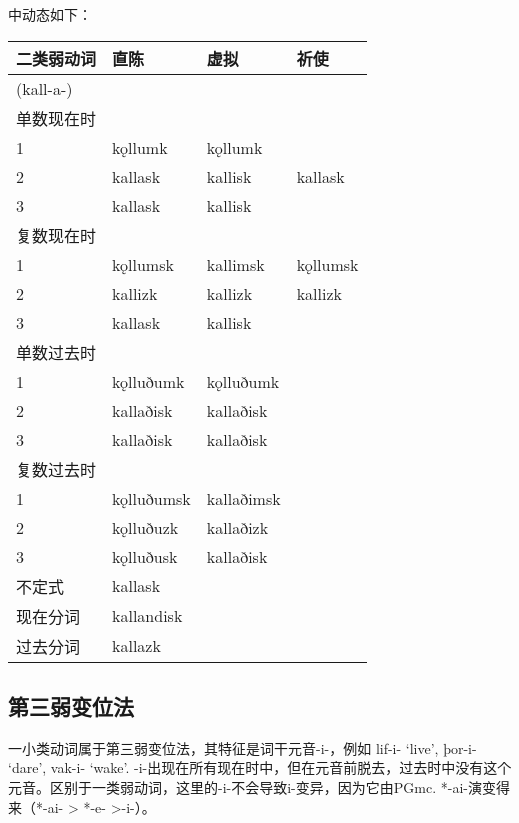 中动态如下：

\begin{longtable}{llll}
  \toprule
  二类弱动词     & 直陈         & 虚拟         & 祈使       \\
  \midrule
  \endhead
  \bottomrule
  \endfoot
  (kall-a-) &            &            &          \\
  单数现在时     &            &            &          \\
  1         & kǫllumk    & kǫllumk    &          \\
  2         & kallask    & kallisk    & kallask  \\
  3         & kallask    & kallisk    &          \\
  复数现在时     &            &            &          \\
  1         & kǫllumsk   & kallimsk   & kǫllumsk \\
  2         & kallizk    & kallizk    & kallizk  \\
  3         & kallask    & kallisk    &          \\
  单数过去时     &            &            &          \\
  1         & kǫlluðumk  & kǫlluðumk  &          \\
  2         & kallaðisk  & kallaðisk  &          \\
  3         & kallaðisk  & kallaðisk  &          \\
  复数过去时     &            &            &          \\
  1         & kǫlluðumsk & kallaðimsk &          \\
  2         & kǫlluðuzk  & kallaðizk  &          \\
  3         & kǫlluðusk  & kallaðisk  &          \\
  不定式       & kallask    &            &          \\
  现在分词      & kallandisk &            &          \\
  过去分词      & kallazk    &            &          \\
\end{longtable}

\subsection{第三弱变位法}\label{第三弱变位法}

一小类动词属于第三弱变位法，其特征是词干元音-i-，例如 lif-i- `live‌',
þor-i- `dare‌', vak-i- `wake‌'.
-i-出现在所有现在时中，但在元音前脱去，过去时中没有这个元音。区别于一类弱动词，这里的-i-不会导致i-变异，因为它由PGmc.
*-ai-演变得来（*-ai- \textgreater{} *-e- \textgreater-i-）。


